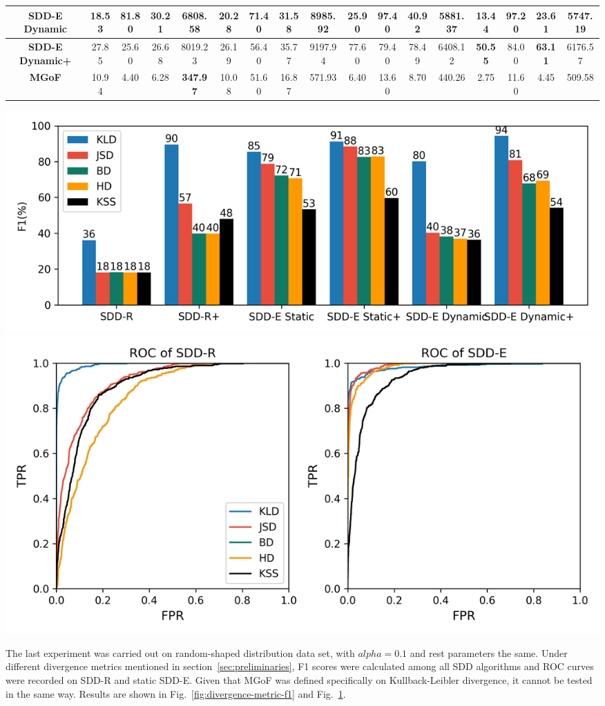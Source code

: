 \documentclass[10pt,conference,letterpaper]{article}
\begin{document}
\begin{table}
\begin{tabular}{|c|c|c|c|c|c|c|c|c|c|c|c|c|c|c|c|c|}
					\textbf{SDD-E Dynamic} & 18.53 & 81.80 & 30.21 & 6808.58 & 20.28 & \textbf{71.40} & 31.58 & 8985.92 & 25.90 & 97.40 & 40.92 & 5881.37 & 13.44 & 97.20 & 23.61 & 5747.19 \\ \hline
					\textbf{SDD-E Dynamic+} & 27.85 & 25.60 & 26.68 & 8019.23 & 26.19 & 56.40 & 35.77 & 9197.94 & 77.60 & 79.40 & 78.49 & 6408.12 & \textbf{50.55} & 84.00 & \textbf{63.11} & 6176.57 \\ \hline
					\textbf{MGoF} & 10.94 & 4.40 & 6.28 & \textbf{347.97} & 10.08 & 51.60 & 16.87 & 571.93 & 6.40 & 13.60 & 8.70 & 440.26 & 2.75 & 11.60 & 4.45 & 509.58 \\ \hline
				\end{tabular}
				
				\begin{multicols}{2}
					\includegraphics[width=\linewidth]{fig/F1OnDivergenceMetric.png}
					\label{fig:divergence-metric-f1}
					\includegraphics[width=.8\linewidth]{fig/ROCUnderDifferentMetrics.png}
					\label{fig:divergence-metric-roc}
				\end{multicols}
			\end{table}
			
			The last experiment was carried out on random-shaped distribution data set, with $alpha=0.1$ and rest parameters the same. Under different divergence metrics mentioned in section~\ref{sec:preliminaries}, F1 scores were calculated among all SDD algorithms and ROC curves were recorded on SDD-R and static SDD-E. Given that MGoF was defined specifically on Kullback-Leibler divergence, it cannot be tested in the same way. Results are shown in Fig.~\ref{fig:divergence-metric-f1} and Fig.~\ref{fig:divergence-metric-roc}.
			
\end{document}
